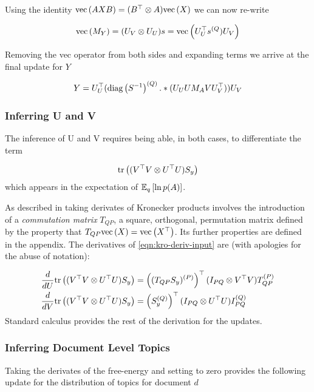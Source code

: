 Using the identity $\vecf{AXB} = (B\T \otimes A)\vecf{X}$ we can now re-write

\begin{align}
\vecf{M_Y} = (U_V \otimes U_U)s = \vecf{U_U^\top s^{(Q}) U_V}
\end{align}

Removing the vec operator from both sides and expanding terms we arrive at the final update for $Y$

\begin{align}
Y = U_U^\top (\diag{\inv{S}}^{(Q)} .* (U_U U M_A V U_V^\top)) U_V
\end{align}

\subsubsection{Inferring U and V}
The inference of U and V requires being able, in both cases, to differentiate the term

\begin{align}
\Tr{(V\T V \otimes U\T U)S_y} \label{eqn:kro-deriv-input}
\end{align}
which appears in the expectation of $\ex{\ln p(A)}{q}$.

As described in \cite{Minka2000a} taking derivates of Kronecker products involves the introduction of a \emph{commutation matrix} $T_{QP}$, a square, orthogonal, permutation matrix defined by the property that $T_{QP} \vecf{X} = \vecf{X\T}$. Its further properties are defined in the appendix. The derivatives of \eqref{eqn:kro-deriv-input} are (with apologies for the abuse of notation):

\begin{align}
\frac{d}{dU} \Tr{(V\T V \otimes U\T U)S_y} 
& = \left( \vt{(T_{QP} S_y)}{P} \right)\T (I_{PQ} \otimes V\T V)\vt{T_{QP}}{P}
\\
\frac{d}{dV} \Tr{(V\T V \otimes U\T U)S_y} 
& = \left(\vt{S_y}{Q}\right)\T (I_{PQ} \otimes U\T U) \vt{I_{PQ}}{Q}
\end{align}
Standard calculus provides the rest of the derivation for the updates.


\subsubsection{Inferring Document Level Topics}
Taking the derivates of the free-energy and setting to zero provides the following update for the distribution of topics for document $d$

